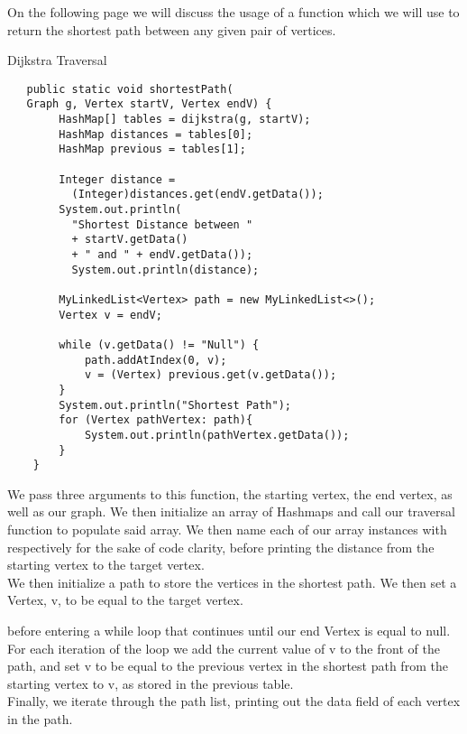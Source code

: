 \documentclass[a4paper]{article}
\begin{document}
On the following page we will discuss the usage of a function which we will use 
to return the shortest path between any given pair of vertices. 

\newpage


\begin{algorithm}
\caption{Dijkstra Traversal}\label{euclid}

\begin{verbatim}
   public static void shortestPath(
   Graph g, Vertex startV, Vertex endV) {
        HashMap[] tables = dijkstra(g, startV);
        HashMap distances = tables[0];
        HashMap previous = tables[1];

        Integer distance =
          (Integer)distances.get(endV.getData());
        System.out.println(
          "Shortest Distance between "
          + startV.getData()
          + " and " + endV.getData());
          System.out.println(distance);

        MyLinkedList<Vertex> path = new MyLinkedList<>();
        Vertex v = endV;

        while (v.getData() != "Null") {
            path.addAtIndex(0, v);
            v = (Vertex) previous.get(v.getData());
        }
        System.out.println("Shortest Path");
        for (Vertex pathVertex: path){
            System.out.println(pathVertex.getData());
        }
    }
\end{verbatim}
\end{algorithm}


\vspace{6mm}
We pass three arguments to this function,
the starting vertex, the end vertex, as well as our graph.
We then initialize an array of Hashmaps and call our traversal function to populate said array.
We then name each of our array instances with respectively for the sake of code clarity,
before printing the distance from the starting vertex to the target vertex. \\

We then initialize a path to store the vertices in the shortest path.
We then set a Vertex, v, to be equal to the target vertex.

before entering a while loop that continues until our end Vertex is equal to null.
For each iteration of the loop we add the current value of v to the front of the path, 
and set v to be equal to the previous vertex in the shortest path from the starting vertex to v, as stored in the previous table. \\

Finally, we iterate through the path list, printing out the data field of each vertex in the path.
\end{document}
